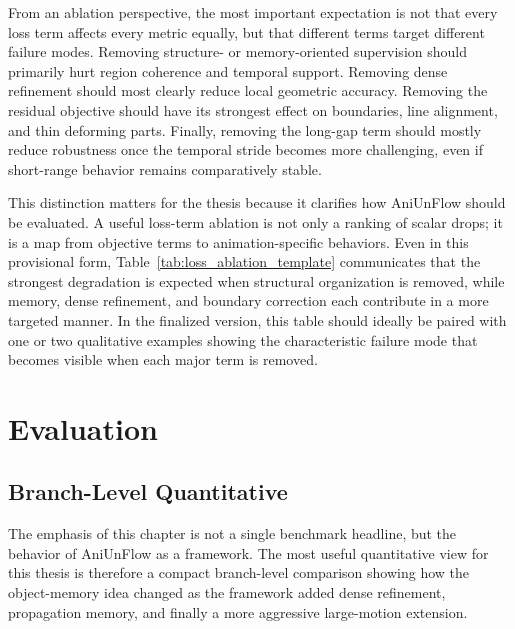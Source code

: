 From an ablation perspective, the most important expectation is not that every loss term affects every metric equally, but that different terms target different failure modes. Removing structure- or memory-oriented supervision should primarily hurt region coherence and temporal support. Removing dense refinement should most clearly reduce local geometric accuracy. Removing the residual objective should have its strongest effect on boundaries, line alignment, and thin deforming parts. Finally, removing the long-gap term should mostly reduce robustness once the temporal stride becomes more challenging, even if short-range behavior remains comparatively stable.

This distinction matters for the thesis because it clarifies how AniUnFlow should be evaluated. A useful loss-term ablation is not only a ranking of scalar drops; it is a map from objective terms to animation-specific behaviors. Even in this provisional form, Table~\ref{tab:loss_ablation_template} communicates that the strongest degradation is expected when structural organization is removed, while memory, dense refinement, and boundary correction each contribute in a more targeted manner. In the finalized version, this table should ideally be paired with one or two qualitative examples showing the characteristic failure mode that becomes visible when each major term is removed.

\chapter{Evaluation}

\section{Branch-Level Quantitative}

The emphasis of this chapter is not a single benchmark headline, but the behavior of AniUnFlow as a framework. The most useful quantitative view for this thesis is therefore a compact branch-level comparison showing how the object-memory idea changed as the framework added dense refinement, propagation memory, and finally a more aggressive large-motion extension.

